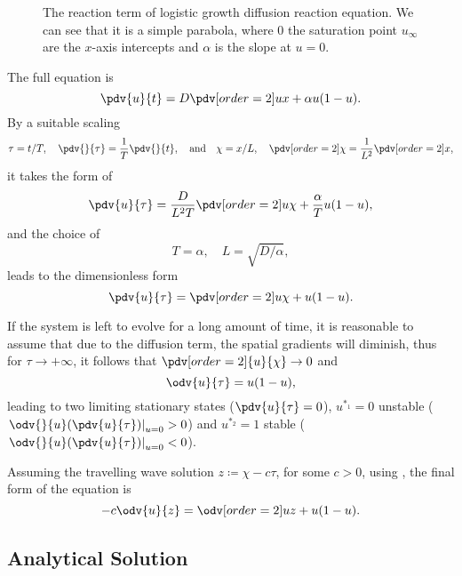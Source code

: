 \begin{figure}[htbp]
    \centering
    
    \caption{
        The reaction term of logistic growth diffusion reaction equation.
        We can see that it is a simple parabola, where \(0\) the saturation point \(u_{\infty}\) are the \(x\)-axis
            intercepts and \(\alpha\) is the slope at \(u=0\).
    }
    \label{fig:logistic-reaction-term}
\end{figure}

The full equation is \[
    \pdv{u}{t} = D\pdv[order={2}]{u}{x} + \alpha u (1 - u).
\]
By a suitable scaling \begin{equation*}
      \tau = t/T, \quad\pdv{}{\tau} = \frac{1}{T} \pdv{}{t}, \quad \text{and}\quad
      \chi = x/L,\quad\pdv[order={2}]{}{\chi} = \frac{1}{L^2}\pdv[order={2}]{}{x},
\end{equation*} it takes the form of \[
\pdv{u}{\tau} = \frac{D}{L^2T}\pdv[order={2}]{u}{\chi} + \frac{\alpha}{T} u(1-u),
\] and the choice of \[
    T = \alpha, \quad L = \sqrt{D/\alpha},
\] leads to the dimensionless form \begin{equation}
\pdv{u}{\tau} = \pdv[order={2}]{u}{\chi} + u(1-u).
\end{equation}

If the system is left to evolve for a long amount of time, it is reasonable to assume that due to the diffusion term,
    the spatial gradients will diminish, thus for \(\tau \to +\infty\), it follows that \(\pdv[order=2]{u}{\chi} \to 0\) 
    and \[
        \odv{u}{\tau} = u(1-u),
    \] leading to two limiting stationary states (\(\pdv{u}{\tau} = 0\)), \(u^{*_1}=0\) unstable
    (\(\left.\odv{}{u}(\pdv{u}{\tau})\right|_{u = 0} > 0\)) and \(u^{*_2}=1\) stable 
        (\(\left.\odv{}{u}(\pdv{u}{\tau})\right|_{u = 0} < 0\)).

Assuming the travelling wave solution \(z \coloneqq \chi - c \tau\), for some \(c > 0\), using ,
    the final form of the equation is \begin{equation}
        \label{eq:travelling-wave-odif-fisher-kpp}
        -c\odv{u}{z} = \odv[order={2}]{u}{z} + u(1-u).
    \end{equation}


\subsection{Analytical Solution}%
\label{sub:analytical_solution}

